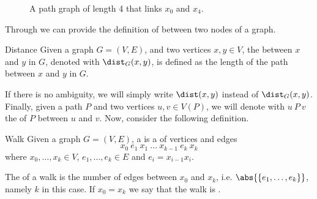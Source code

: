 \documentclass[a4paper, 12pt]{report}
\begin{document}
    \begin{figure}[H]
        \centering
        \caption{A path graph of length 4 that links $x_0$ and $x_4$.}
    \end{figure}

    Through  we can provide the definition of  between two nodes of a graph.

    \begin{frameddefn}{Distance}
        Given a graph $G = (V, E)$, and two vertices $x, y \in V$, the  between $x$ and $y$ in $G$, denoted with $\dist_G(x, y)$, is defined as the length of the  path between $x$ and $y$ in $G$.
    \end{frameddefn}

    If there is no ambiguity, we will simply write $\dist(x, y)$ instead of $\dist_G(x, y)$. Finally, given a path $P$ and two vertices $u, v \in V(P)$, we will denote with $u \ P \ v$ the  of $P$ between $u$ and $v$. Now, consider the following definition.

    \begin{frameddefn}{Walk}
        Given a graph $G = (V, E)$, a  is a  of vertices and edges $$x_0 \ e_1 \ x_1 \ \ldots \ x_{k - 1} \ e_k \ x_k$$ where $x_0, \ldots, x_k \in V$, $e_1, \ldots, e_k \in E$ and $e_i = x_{i - 1}x_i$.

        The  of a walk is the number of edges between $x_0$ and $x_k$, i.e. $\abs{\{e_1, \ldots , e_k \}}$, namely $k$ in this case. If $x_0 = x_k$ we say that the walk is .
    \end{frameddefn}
\end{document}
